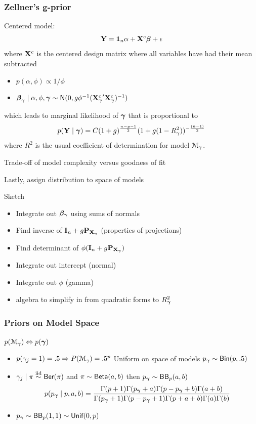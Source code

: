 \documentclass[handout]{beamer}
\begin{document}
\begin{frame}\frametitle{Zellner's g-prior}
  Centered model:  $$\mathbf{Y} = \mathbf{1}_n \alpha + \mathbf{X}^c \boldsymbol{\beta} + \epsilon$$
  where $\mathbf{X}^c$ is the centered design matrix where all variables have
  had their mean subtracted \pause
\begin{itemize}
\item   $p(\alpha, \phi) \propto 1/\phi$ \pause
\item  $\boldsymbol{\beta}_\gamma \mid \alpha, \phi, \boldsymbol{\gamma} \sim \textsf{N}(0, g \phi^{-1}
  ({\mathbf{X}_{\boldsymbol{\gamma}}^c}^\prime \mathbf{X}_{\boldsymbol{\gamma}}^c)^{-1})$ \pause
\end{itemize}
which leads to marginal likelihood of $\boldsymbol{\gamma}$ that is proportional
to $$ p(\mathbf{Y} \mid \boldsymbol{\gamma}) = C (1 + g)^{\frac{n-p-1}{2}} ( 1 + g (1 -
 R^2_\gamma))^{- \frac{(n-1)}{2}}$$
where $R^2$ is the usual coefficient of determination for model ${\cal M}_\gamma$.
\pause

Trade-off of model complexity versus goodness of fit

\bigskip
Lastly, assign distribution to space of models
\end{frame}

\begin{frame}{Sketch}
\begin{itemize}
  \item  Integrate out $\boldsymbol{\beta_\gamma}$  using sums of normals \pause
  \item  Find inverse of $\mathbf{I}_n + g \mathbf{P}_{\mathbf{X}_{\boldsymbol{\gamma}}}$  (properties of projections) \pause
  \item Find determinant of $\phi (\mathbf{I}_n + g \mathbf{P}_{\mathbf{X}_{\boldsymbol{\gamma}}})$  \pause
  \item Integrate out intercept (normal)  \pause
  \item Integrate out $\phi$  (gamma)  \pause
  \item algebra to simplify in from quadratic forms to  $R^2_{\boldsymbol{\gamma}}$
\end{itemize}

\end{frame}
\begin{frame}
  \frametitle{Priors on Model Space}
  $p({\cal M}_\gamma) \Leftrightarrow p(\boldsymbol{\gamma})$
  \begin{itemize}
  \item $p(\gamma_j = 1) = .5 \Rightarrow P({\cal M}_\gamma) = .5^p$  Uniform on space of models \pause $p_{\boldsymbol{\gamma}} \sim \textsf{Bin}(p, .5)$
\item $\gamma_j \mid \pi \mathrel{\mathop{\sim}\limits^{\rm iid}} \textsf{Ber}(\pi)$ and $\pi \sim \textsf{Beta}(a,b)$ then  $p_{\boldsymbol{\gamma}} \sim \textsf{BB}_p(a, b)$
$$
p(p_{\boldsymbol{\gamma}} \mid p, a, b) = \frac{ \Gamma(p + 1) \Gamma(p_{\boldsymbol{\gamma}} + a) \Gamma(p - p_{\boldsymbol{\gamma}} + b) \Gamma (a + b) }{\Gamma(p_{\boldsymbol{\gamma}}+1) \Gamma(p - p_{\boldsymbol{\gamma}} + 1) \Gamma(p + a + b) \Gamma(a) \Gamma(b)}
$$
\item $p_{\boldsymbol{\gamma}} \sim \textsf{BB}_p(1, 1) \sim \textsf{Unif}(0, p)$
  \end{itemize}
\end{frame}
\end{document}
